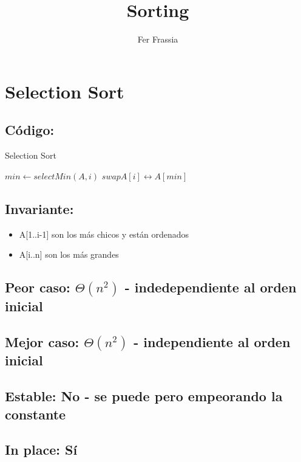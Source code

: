 \documentclass[a4paper]{article}
\begin{document}
\title{Sorting}
\author{Fer Frassia}
\maketitle
\tableofcontents

\newpage
\section{Selection Sort}

\subsection{C\'odigo:}
\begin{algorithm}
\caption{Selection Sort}\label{selection}
\begin{algorithmic}[1]
   	\State $min \gets selectMin(A, i)$ 
	\State $swap A[i] \leftrightarrow A[min]$ 
    \EndFor
\EndProcedure
\end{algorithmic}
\end{algorithm}

\subsection{Invariante:}
\begin{itemize}
	\item{A[1..i-1] son los m\'as chicos y est\'an ordenados}
	\item{A[i..n] son los m\'as grandes}
\end{itemize}

\subsection{Peor caso: $\Theta (n^{2})$ - indedependiente al orden inicial}
\subsection{Mejor caso: $\Theta (n^{2})$ - independiente al orden inicial}
\subsection{Estable: No - se puede pero empeorando la constante}
\subsection{In place: S\'i}
\end{document}
